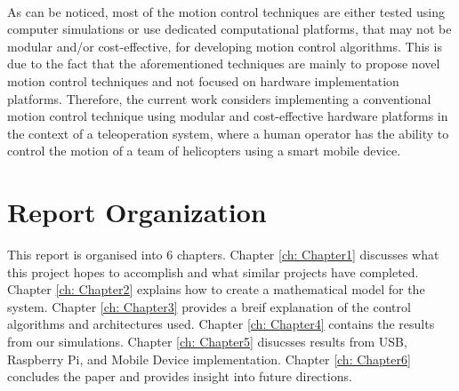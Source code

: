 \\
As can be noticed, most of the motion control techniques are either tested using computer simulations or use dedicated computational platforms, that may not be modular and/or cost-effective, for developing motion control algorithms. This is due to the fact that the aforementioned techniques are mainly to propose novel motion control techniques and not focused on hardware implementation platforms. Therefore, the current work considers implementing a conventional motion control technique using modular and cost-effective hardware platforms in the context of a teleoperation system, where a human operator has the ability to control the motion of a team of helicopters using a smart mobile device.


\section{Report Organization}
This report is organised into 6 chapters.  Chapter \ref{ch: Chapter1} discusses what this project hopes to accomplish and what similar projects have completed.  Chapter \ref{ch: Chapter2} explains how to create a mathematical model for the system.  Chapter \ref{ch: Chapter3} provides a breif explanation of the control algorithms and architectures used.  Chapter \ref{ch: Chapter4} contains the results from our simulations.  Chapter \ref{ch: Chapter5} disucsses results from USB, Raspberry Pi, and Mobile Device implementation.  Chapter \ref{ch: Chapter6} concludes the paper and provides insight into future directions.

